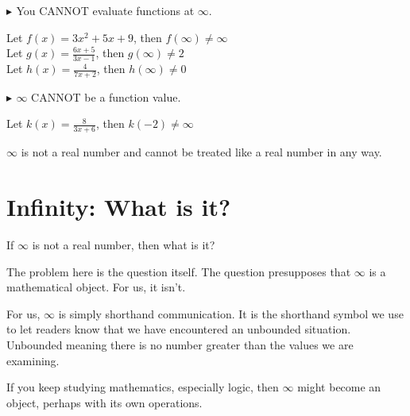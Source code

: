 \documentclass{ximera}
\begin{document}
\textbf{\textcolor{red!90!darkgray}{$\blacktriangleright$ }} You CANNOT evaluate functions at $\infty$.



\begin{example}


Let $f(x) = 3x^2 + 5x + 9$, then $f(\infty) \ne \infty$ \\

Let $g(x) = \frac{6x + 5}{3x - 1}$, then $g(\infty) \ne 2$ \\

Let $h(x) = \frac{4}{7x + 2}$, then $h(\infty) \ne 0$ \\

\end{example}











\textbf{\textcolor{red!90!darkgray}{$\blacktriangleright$ }} $\infty$ CANNOT be a function value.



\begin{example}



Let $k(x) = \frac{8}{3x + 6}$, then $k(-2) \ne \infty$ \\

\end{example}

$\infty$ is not a real number and cannot be treated like a real number in any way.








\section{Infinity: What is it?}


If $\infty$ is not a real number, then what is it?


The problem here is the question itself.  The question presupposes that $\infty$ is a mathematical object.  For us, it isn't.   

For us, $\infty$ is simply shorthand communication.  It is the shorthand symbol we use to let readers know that we have encountered an unbounded situation. Unbounded meaning there is no number greater than the values we are examining.


If you keep studying mathematics, especially logic, then $\infty$ might become an object, perhaps with its own operations.
\end{document}

